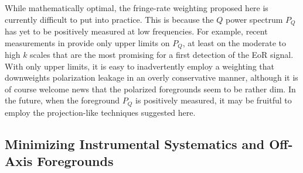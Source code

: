 \documentclass[twocolumn,apj,numberedappendix]{emulateapj}
\begin{document}
While mathematically optimal, the fringe-rate weighting proposed here is currently difficult
to put into practice. This is because the $Q$ power spectrum $P_Q$ has yet to be positively
measured at low frequencies. For example, recent measurements in \citet{moore_et_al2015}
provide only upper limits on $P_Q$, at least on the moderate to high $k$ scales that are the
most promising for a first detection of the EoR signal. With only upper limits, it is easy
to inadvertently employ a weighting that downweights polarization leakage in an overly
conservative manner, although it is of course welcome news that the polarized foregrounds
seem to be rather dim. In the future, when the foreground $P_Q$ is positively measured,
it may be fruitful to employ the projection-like techniques suggested here.
%
%


\subsection{Minimizing Instrumental Systematics and Off-Axis Foregrounds}
\label{sec:foregrounds}
\end{document}
